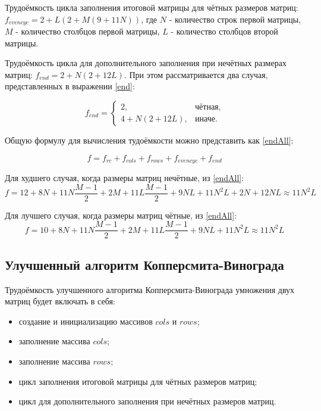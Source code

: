 \documentclass[12pt]{report}
\begin{document}
Трудоёмкость цикла заполнения итоговой матрицы для чётных размеров матриц: $f_{evencyc} = 2 + L(2 + M(9 + 11N))$, где $N$ - количество строк первой матрицы, $M$ - количество столбцов первой матрицы, $L$ - количество столбцов второй матрицы.

Трудоёмкость цикла для дополнительного заполнения при нечётных размерах матриц: $f_{end} = 2 + N(2 + 12L)$. При этом рассматривается два случая, представленных в выражении \ref{end}:

\begin{equation}
	\label{end}
            f_{end} = \begin{cases}
                2, & \text{чётная,}\\
                4 + N(2 + 12L), & \text{иначе.}
            \end{cases}
        \end{equation}
        
Общую формулу для вычисления тудоёмкости можно представить как \ref{endAll}:

\begin{equation}
	\label{endAll}
	f = f_{rc} + f_{cols} + f_{rows} + f_{evencyc} + f_{end}
\end{equation}

Для худшего случая, когда размеры матриц нечётные, из \ref{endAll}:
\begin{equation}
	\label{bad}
	f = 12 +8N + 11N\frac{M - 1}{2} + 2M + 11L\frac{M-1}{2}+ 9NL + 11N^{2}L + 2N + 12NL \approx 11N^{2}L
\end{equation}

Для лучшего случая, когда размеры матриц чётные, из \ref{endAll}:
\begin{equation}
	\label{good}
	f = 10 + 8N + 11N\frac{M - 1}{2} + 2M + 11L\frac{M-1}{2}+ 9NL + 11N^{2}L\approx 11N^{2}L
\end{equation}

\subsection{Улучшенный алгоритм Копперсмита-Винограда}
Трудоёмкость улучшенного алгоритма Копперсмита-Винограда умножения двух матриц будет включать в себя:
\begin{itemize}
\item создание и инициализацию массивов $cols$ и $rows$;
\item заполнение массива $cols$;
\item заполнение массива $rows$;
\item цикл заполнения итоговой матрицы для чётных размеров матриц;
\item цикл для дополнительного заполнения при нечётных размеров матриц.
\end{itemize}
\end{document}
